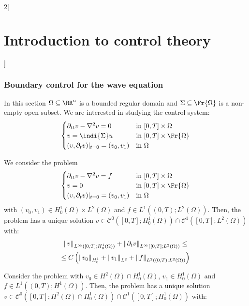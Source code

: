 \documentclass[../../../main_math.tex]{subfiles}
\begin{document}
\begin{multicols}{2}[\section{Introduction to control theory}]
  \subsubsection{Boundary control for the wave equation}
  In this section $\Omega\subseteq \RR^n$ is a bounded regular domain and $\Sigma\subseteq \Fr{\Omega}$ is a non-empty open subset. We are interested in studying the control system:
  \begin{equation}\label{ICT:wave_equation_control}
    \begin{cases}
      \partial_{tt} v - \laplacian v = 0  & \text{in } [0,T]\times \Omega      \\
      v = \indi{\Sigma}u                  & \text{in } [0,T]\times \Fr{\Omega} \\
      (v,\partial_t v)|_{t=0} = (v_0,v_1) & \text{in } \Omega
    \end{cases}
  \end{equation}
  \begin{theorem}
    We consider the problem
    \begin{equation}\label{ICT:wave_equation_cauchy}
      \begin{cases}
        \partial_{tt} v - \laplacian v = f  & \text{in } [0,T]\times \Omega      \\
        v = 0                               & \text{in } [0,T]\times \Fr{\Omega} \\
        (v,\partial_t v)|_{t=0} = (v_0,v_1) & \text{in } \Omega
      \end{cases}
    \end{equation}
    with $(v_0,v_1)\in H_0^1(\Omega)\times L^2(\Omega)$ and $f\in L^1((0,T); L^2(\Omega))$. Then, the problem has a unique solution $v\in \mathcal{C}^0([0,T]; H_0^1(\Omega))\cap \mathcal{C}^1([0,T]; L^2(\Omega))$ with:
    \begin{multline*}
      \norm{v}_{L^\infty([0,T]; H_0^1(\Omega))}+\norm{\partial_t v}_{L^\infty([0,T]; L^2(\Omega))}\leq \\\leq C\left(\norm{v_0}_{H_0^1}+\norm{v_1}_{L^2}+ \norm{f}_{L^2((0,T); L^2(\Omega))}\right)
    \end{multline*}
  \end{theorem}
  \begin{theorem}
    Consider the problem  with $v_0\in H^2(\Omega)\cap H_0^1(\Omega)$, $v_1\in H_0^1(\Omega)$ and $f\in L^1((0,T); H^1(\Omega))$. Then, the problem has a unique solution $v\in \mathcal{C}^0([0,T]; H^2(\Omega)\cap H_0^1(\Omega))\cap \mathcal{C}^1([0,T]; H_0^1(\Omega))$ with:

\end{theorem}
\end{multicols}
\end{document}
